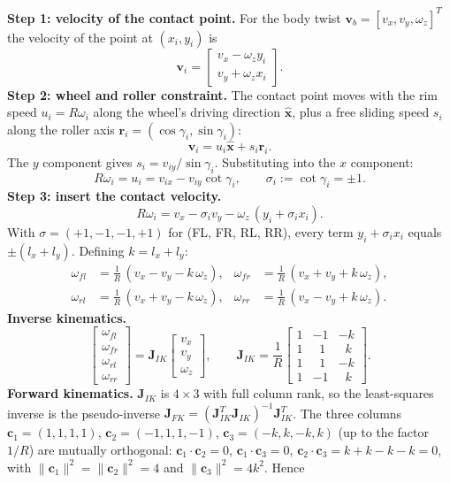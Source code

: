 \documentclass[11pt,a4paper]{article}
\begin{document}
\textbf{Step 1: velocity of the contact point.} For the body twist $\mathbf v_b=[v_x,v_y,\omega_z]^T$ the velocity of the point at $(x_i,y_i)$ is
\[
\mathbf v_i=\begin{bmatrix}v_x-\omega_z y_i\\ v_y+\omega_z x_i\end{bmatrix}.
\]
\textbf{Step 2: wheel and roller constraint.} The contact point moves with the rim speed $u_i=R\omega_i$ along the wheel's driving direction $\hat{\mathbf x}$, plus a free sliding speed $s_i$ along the roller axis $\mathbf r_i=(\cos\gamma_i,\sin\gamma_i)$:
\[
\mathbf v_i=u_i\hat{\mathbf x}+s_i\mathbf r_i .
\]
The $y$ component gives $s_i=v_{iy}/\sin\gamma_i$. Substituting into the $x$ component:
\[
R\omega_i=u_i=v_{ix}-v_{iy}\cot\gamma_i,\qquad \sigma_i:=\cot\gamma_i=\pm1 .
\]
\textbf{Step 3: insert the contact velocity.}
\[
R\omega_i=v_x-\sigma_i v_y-\omega_z\,(y_i+\sigma_i x_i).
\]
With $\sigma=(+1,-1,-1,+1)$ for (FL, FR, RL, RR), every term $y_i+\sigma_i x_i$ equals $\pm(l_x+l_y)$. Defining $k=l_x+l_y$:
\[
\begin{aligned}
\omega_{fl}&=\tfrac1R\,(v_x-v_y-k\,\omega_z), &
\omega_{fr}&=\tfrac1R\,(v_x+v_y+k\,\omega_z),\\
\omega_{rl}&=\tfrac1R\,(v_x+v_y-k\,\omega_z), &
\omega_{rr}&=\tfrac1R\,(v_x-v_y+k\,\omega_z).
\end{aligned}
\]
\textbf{Inverse kinematics.}
\[
\begin{bmatrix}\omega_{fl}\\\omega_{fr}\\\omega_{rl}\\\omega_{rr}\end{bmatrix}=\mathbf J_{IK}\begin{bmatrix}v_x\\v_y\\\omega_z\end{bmatrix},\qquad
\mathbf J_{IK}=\frac1R\begin{bmatrix}1&-1&-k\\1&\;\;1&\;\;k\\1&\;\;1&-k\\1&-1&\;\;k\end{bmatrix}.
\]
\textbf{Forward kinematics.} $\mathbf J_{IK}$ is $4\times3$ with full column rank, so the least-squares inverse is the pseudo-inverse $\mathbf J_{FK}=(\mathbf J_{IK}^T\mathbf J_{IK})^{-1}\mathbf J_{IK}^T$. The three columns $\mathbf c_1=(1,1,1,1)$, $\mathbf c_2=(-1,1,1,-1)$, $\mathbf c_3=(-k,k,-k,k)$ (up to the factor $1/R$) are mutually orthogonal: $\mathbf c_1\!\cdot\!\mathbf c_2=0$, $\mathbf c_1\!\cdot\!\mathbf c_3=0$, $\mathbf c_2\!\cdot\!\mathbf c_3=k+k-k-k=0$, with $\|\mathbf c_1\|^2=\|\mathbf c_2\|^2=4$ and $\|\mathbf c_3\|^2=4k^2$. Hence
\end{document}
